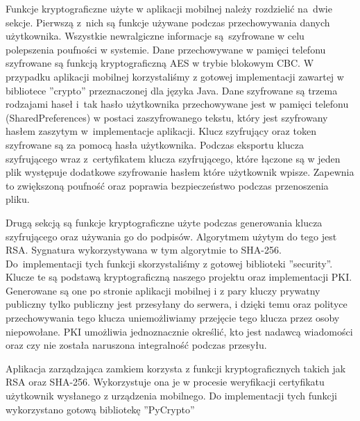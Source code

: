 \documentclass[twoside,10pt]{article}
\begin{document}
Funkcje kryptograficzne użyte w aplikacji mobilnej należy rozdzielić na~dwie sekcje. Pierwszą z~nich są funkcje używane podczas przechowywania danych użytkownika. Wszystkie newralgiczne informacje są~szyfrowane w celu polepszenia poufności w systemie. Dane przechowywane w pamięci telefonu szyfrowane są funkcją kryptograficzną AES w trybie blokowym CBC. W przypadku aplikacji mobilnej korzystaliśmy z gotowej implementacji zawartej w bibliotece ''crypto'' przeznaczonej dla języka Java. Dane szyfrowane są trzema rodzajami haseł i~tak hasło użytkownika przechowywane jest w pamięci telefonu (SharedPreferences) w postaci zaszyfrowanego tekstu, który jest szyfrowany hasłem zaszytym w~implementacje aplikacji. Klucz szyfrujący oraz token szyfrowane są za pomocą hasła użytkownika. Podczas eksportu klucza szyfrującego wraz z~certyfikatem klucza szyfrującego, które łączone są w jeden plik   występuje dodatkowe szyfrowanie hasłem które użytkownik wpisze. Zapewnia to zwiększoną poufność oraz poprawia bezpieczeństwo podczas przenoszenia pliku.                

Drugą sekcją są funkcje kryptograficzne użyte podczas generowania klucza szyfrującego oraz używania go do podpisów. Algorytmem użytym do tego jest RSA. Sygnatura wykorzystywana w tym algorytmie to SHA-256. Do~implementacji tych funkcji skorzystaliśmy z gotowej biblioteki ''security''. Klucze te są podstawą kryptograficzną naszego projektu oraz implementacji PKI. Generowane są one po stronie aplikacji mobilnej i z pary kluczy prywatny publiczny tylko publiczny jest przesyłany do serwera, i dzięki temu oraz polityce przechowywania tego klucza uniemożliwiamy przejęcie tego klucza przez osoby niepowołane. PKI umożliwia jednoznacznie określić, kto jest nadawcą wiadomości oraz czy nie została naruszona integralność podczas przesyłu.

Aplikacja zarządzająca zamkiem korzysta z funkcji kryptograficznych takich jak RSA oraz SHA-256. \linebreak Wykorzystuje ona je w procesie weryfikacji certyfikatu użytkownik wysłanego z urządzenia mobilnego. Do implementacji tych funkcji wykorzystano gotową bibliotekę ''PyCrypto''

\newpage
\end{document}
